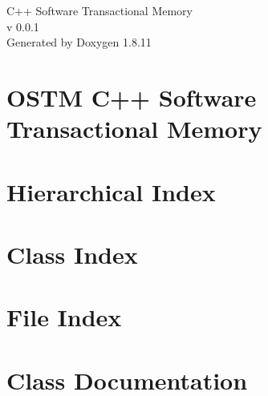 \documentclass[twoside]{book}
\newcommand{\+}{\discretionary{\mbox{\scriptsize$\hookleftarrow$}}{}{}}
\newcommand{\clearemptydoublepage}{%
  \newpage{\pagestyle{empty}\cleardoublepage}%
}
\begin{document}
\hypersetup{pageanchor=false,
             bookmarksnumbered=true,
             pdfencoding=unicode
            }
\begin{titlepage}
\vspace*{7cm}
\begin{center}%
{\Large C++ Software Transactional Memory \\[1ex]\large v 0.\+0.\+1 }\\
\vspace*{1cm}
{\large Generated by Doxygen 1.8.11}\\
\end{center}
\end{titlepage}
\clearemptydoublepage
\tableofcontents
\clearemptydoublepage
{}
\hypersetup{pageanchor=true}

\chapter{O\+S\+TM C++ Software Transactional Memory}
\label{index}\hypertarget{index}{}
\chapter{Hierarchical Index}

\chapter{Class Index}

\chapter{File Index}

\chapter{Class Documentation}

















\end{document}
